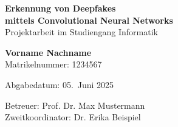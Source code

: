 \thispagestyle{empty}
\begin{titlepage}
    \begin{center}
        \vspace*{2cm}
        {\Huge\textbf{Erkennung von Deepfakes\\ mittels Convolutional Neural Networks}}\\
        \vspace{1cm}
        {\Large Projektarbeit im Studiengang Informatik}\\
        \vspace{2cm}

        {\Large \textbf{Vorname Nachname}}\\
        \vspace{0.5cm}
        Matrikelnummer: 1234567\\
        \vspace{1cm}

        \vspace{1cm}

        {\large Abgabedatum: 05.\ Juni 2025}\\
        \vfill

        Betreuer: Prof. Dr. Max Mustermann\\
        Zweitkoordinator: Dr. Erika Beispiel
    \end{center}
\end{titlepage}
